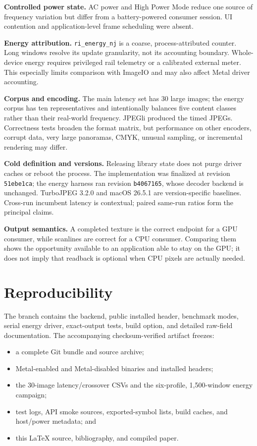 \documentclass[10pt,twocolumn]{article}
\newcommand{\code}[1]{\texttt{#1}}
\begin{document}
\textbf{Controlled power state.}  AC power and High Power Mode reduce one
source of frequency variation but differ from a battery-powered consumer
session.  UI contention and application-level frame scheduling were absent.

\textbf{Energy attribution.}  \code{ri\_energy\_nj} is a coarse,
process-attributed counter.  Long windows resolve its update granularity, not
its accounting boundary.  Whole-device energy requires privileged rail
telemetry or a calibrated external meter.  This especially limits comparison
with ImageIO and may also affect Metal driver accounting.

\textbf{Corpus and encoding.}  The main latency set has 30 large images; the
energy corpus has ten representatives and intentionally balances five content
classes rather than their real-world frequency.  JPEGli produced the timed
JPEGs.  Correctness tests broaden the format matrix, but performance on other
encoders, corrupt data, very large panoramas, CMYK, unusual sampling, or
incremental rendering may differ.

\textbf{Cold definition and versions.}  Releasing library state does not
purge driver caches or reboot the process.  The implementation was finalized
at revision \code{51ebe1ca}; the energy harness ran revision \code{b4067165},
whose decoder backend is unchanged.  TurboJPEG 3.2.0 and macOS 26.5.1 are
version-specific baselines.  Cross-run incumbent latency is contextual; paired
same-run ratios form the principal claims.

\textbf{Output semantics.}  A completed texture is the correct endpoint for a
GPU consumer, while scanlines are correct for a CPU consumer.  Comparing them
shows the opportunity available to an application able to stay on the GPU; it
does not imply that readback is optional when CPU pixels are actually needed.

\section{Reproducibility}

The branch contains the backend, public installed header, benchmark modes,
serial energy driver, exact-output tests, build option, and detailed raw-field
documentation.  The accompanying checksum-verified artifact freezes:

\begin{itemize}
  \item a complete Git bundle and source archive;
  \item Metal-enabled and Metal-disabled binaries and installed headers;
  \item the 30-image latency/crossover CSVs and the six-profile, 1,500-window
        energy campaign;
  \item test logs, API smoke sources, exported-symbol lists, build caches, and
        host/power metadata; and
  \item this LaTeX source, bibliography, and compiled paper.
\end{itemize}
\end{document}
